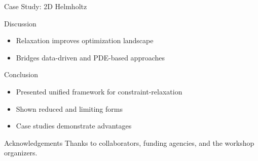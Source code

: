\documentclass{beamer}
\begin{document}
\begin{frame}{Case Study: 2D Helmholtz}
\end{frame}

\begin{frame}{Discussion}
\begin{itemize}
  \item Relaxation improves optimization landscape
  \item Bridges data-driven and PDE-based approaches
\end{itemize}
\end{frame}

\begin{frame}{Conclusion}
\begin{itemize}
  \item Presented unified framework for constraint-relaxation
  \item Shown reduced and limiting forms
  \item Case studies demonstrate advantages
\end{itemize}
\end{frame}

\begin{frame}{Acknowledgements}
\small
Thanks to collaborators, funding agencies, and the workshop organizers.
\end{frame}
\end{document}

